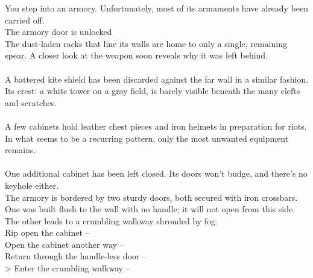 You step into an armory. Unfortunately, most of its armaments have already been carried off.\\
 The armory door is unlocked\\

The dust-laden racks that line its walls are home to only a single, remaining spear. A closer look at the weapon soon reveals why it was left behind.\\
\\

A battered kite shield has been discarded against the far wall in a similar fashion. Its crest: a white tower on a gray field, is barely visible beneath the many clefts and scratches.\\
\\

A few cabinets hold leather chest pieces and iron helmets in preparation for riots. In what seems to be a recurring pattern, only the most unwanted equipment remains.\\
\\

One additional cabinet has been left closed. Its doors won’t budge, and there’s no keyhole either.\\

The armory is bordered by two sturdy doors, both secured with iron crossbars. One was built flush to the wall with no handle; it will not open from this side. The other leads to a crumbling walkway shrouded by fog.\\

 Rip open the cabinet -- \\
 Open the cabinet another way -- \\
 Return through the handle-less door -- \\
> Enter the crumbling walkway -- 